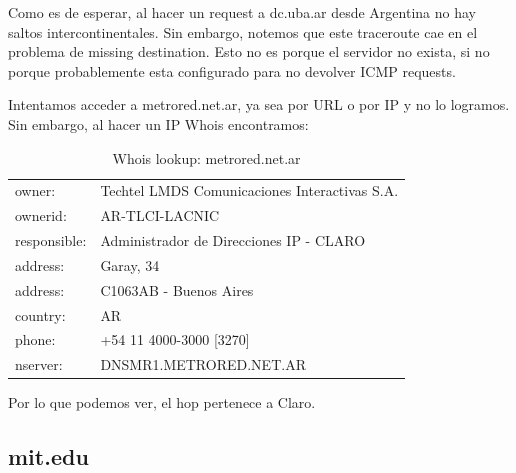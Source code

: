 Como es de esperar, al hacer un request a dc.uba.ar desde Argentina no hay saltos intercontinentales. Sin embargo, notemos que este traceroute cae en el problema de missing destination. Esto no es porque el servidor no exista, si no porque probablemente esta configurado para no devolver ICMP requests.

Intentamos acceder a metrored.net.ar, ya sea por URL o por IP y no lo logramos. Sin embargo, al hacer un IP Whois encontramos:

\begin{table}[H]
\centering
\caption{Whois lookup: metrored.net.ar}
\begin{tabular}{@{}ll@{}}
\toprule
owner:       &   Techtel LMDS Comunicaciones Interactivas S.A. \\
ownerid:     &   AR-TLCI-LACNIC \\
responsible: & Administrador de Direcciones IP - CLARO \\
address:     &   Garay, 34 \\
address:     &   C1063AB - Buenos Aires \\
country:     &   AR \\
phone:       &   +54 11 4000-3000 [3270] \\
nserver:     &   DNSMR1.METRORED.NET.AR   \\ \bottomrule
\end{tabular}
\end{table}

Por lo que podemos ver, el hop pertenece a Claro.

\subsection{mit.edu}

